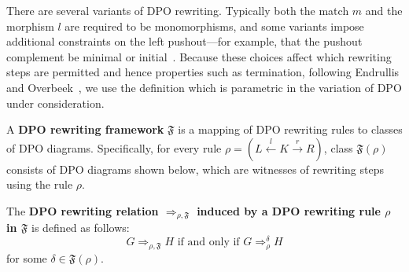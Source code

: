 There are several variants of DPO rewriting. Typically both the match $m$ and the morphism $l$ are required to be monomorphisms, and some variants impose additional constraints on the left pushout—for example, that the pushout complement be minimal or initial~\cite{braatz2011delete,behr2021concurrency,behr2023fundamentals}. Because these choices affect which rewriting steps are permitted and hence properties such as termination, following Endrullis and Overbeek~\cite{endrullis2024generalized_icgt}, we use the definition which is parametric in the variation of DPO under consideration.
\begin{definition}
  \label{def:rewriting_framework} 
    A \textbf{DPO rewriting framework} $\mathfrak{F}$ is a mapping of DPO rewriting rules to classes of DPO diagrams. Specifically, for every rule \( \rho \mathop{=} (L \overset{l}{\leftarrow} K \overset{r}{\rightarrow} R) \), class $\mathfrak{F}(\rho)$ consists of DPO diagrams shown below, which are witnesses of rewriting steps using the rule \( \rho \).
\begin{center}
    \end{center}
    The \textbf{DPO rewriting relation $\mathop{\Rightarrow}_{\rho,\mathfrak{F}}$ induced by a DPO rewriting rule $\rho$ in $\mathfrak{F}$} is defined as follows:
     $$G \mathop{\Rightarrow}_{\rho,\mathfrak{F}} H\text{ if and only if }G \mathop{\Rightarrow}_\rho^\delta H$$
    for some $\delta \mathop{\in} \mathfrak{F}(\rho)$. 
     

\end{definition}
